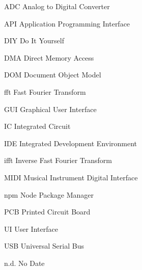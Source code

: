 \begin{acronyms}
  \item[ADC] Analog to Digital Converter
  \item[API] Application Programming Interface
  \item[DIY] Do It Yourself
  \item[DMA] Direct Memory Access
  \item[DOM] Document Object Model
  \item[fft] Fast Fourier Transform
  \item[GUI] Graphical User Interface
  \item[IC] Integrated Circuit
  \item[IDE] Integrated Development Environment
  \item[ifft] Inverse Fast Fourier Transform
  \item[MIDI] Musical Instrument Digital Interface
  \item[npm] Node Package Manager
  \item[PCB] Printed Circuit Board
  \item[UI] User Interface
  \item[USB] Universal Serial Bus
  \item[n.d.] No Date
\end{acronyms}
